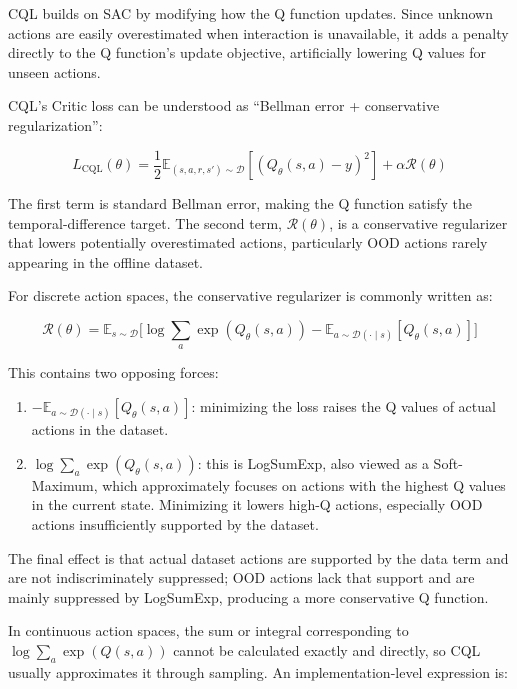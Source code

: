 CQL builds on SAC by modifying how the Q function updates. Since unknown actions are easily overestimated when interaction is unavailable, it adds a penalty directly to the Q function's update objective, artificially lowering Q values for unseen actions.

CQL's Critic loss can be understood as ``Bellman error + conservative regularization'':

\[
L_{\mathrm{CQL}}(\theta)
=\frac{1}{2}\mathbb{E}_{(s,a,r,s')\sim\mathcal D}
[(Q_\theta(s,a)-y)^{2}]
+\alpha \mathcal R(\theta)
\]

The first term is standard Bellman error, making the Q function satisfy the temporal-difference target. The second term, \(\mathcal R(\theta)\), is a conservative regularizer that lowers potentially overestimated actions, particularly OOD actions rarely appearing in the offline dataset.

For discrete action spaces, the conservative regularizer is commonly written as:

\[
\mathcal R(\theta)
=\mathbb{E}_{s\sim\mathcal D}
\bigl[
\log \sum_a \exp(Q_\theta(s,a))
-\mathbb{E}_{a\sim\mathcal D(\cdot\mid s)}[Q_\theta(s,a)]
\bigr]
\]

This contains two opposing forces:

\begin{enumerate}
\def\labelenumi{\arabic{enumi}.}
\tightlist
\item
  \(-\mathbb{E}_{a\sim\mathcal D(\cdot\mid s)}[Q_\theta(s,a)]\): minimizing the loss raises the Q values of actual actions in the dataset.
\item
  \(\log \sum_a \exp(Q_\theta(s,a))\): this is LogSumExp, also viewed as a Soft-Maximum, which approximately focuses on actions with the highest Q values in the current state. Minimizing it lowers high-Q actions, especially OOD actions insufficiently supported by the dataset.
\end{enumerate}

The final effect is that actual dataset actions are supported by the data term and are not indiscriminately suppressed; OOD actions lack that support and are mainly suppressed by LogSumExp, producing a more conservative Q function.

In continuous action spaces, the sum or integral corresponding to \(\log\sum_a\exp(Q(s,a))\) cannot be calculated exactly and directly, so CQL usually approximates it through sampling. An implementation-level expression is:

